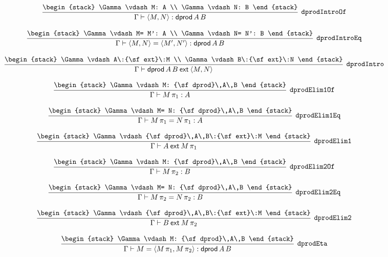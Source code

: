 \[
\infer[{\tt dprodIntroOf}]{\Gamma \vdash \langle M,N\rangle : {\sf dprod}\,A\,B}{
\begin{stack}
\Gamma \vdash M: A
\\
\Gamma \vdash N: B
\end{stack}}
\]

\[
\infer[{\tt dprodIntroEq}]{\Gamma \vdash \langle M,N\rangle = \langle M',N'\rangle : {\sf dprod}\,A\,B}{
\begin{stack}
\Gamma \vdash M= M': A
\\
\Gamma \vdash N= N': B
\end{stack}}
\]

\[
\infer[{\tt dprodIntro}]{\Gamma \vdash {\sf dprod}\,A\,B\:{\sf ext}\:\langle M,N\rangle }{
\begin{stack}
\Gamma \vdash A\:{\sf ext}\:M
\\
\Gamma \vdash B\:{\sf ext}\:N
\end{stack}}
\]

\[
\infer[{\tt dprodElim1Of}]{\Gamma \vdash M\, \pi_1: A}{
\begin{stack}
\Gamma \vdash M: {\sf dprod}\,A\,B
\end{stack}}
\]

\[
\infer[{\tt dprodElim1Eq}]{\Gamma \vdash M\, \pi_1= N\, \pi_1: A}{
\begin{stack}
\Gamma \vdash M= N: {\sf dprod}\,A\,B
\end{stack}}
\]

\[
\infer[{\tt dprodElim1}]{\Gamma \vdash A\:{\sf ext}\:M\, \pi_1}{
\begin{stack}
\Gamma \vdash {\sf dprod}\,A\,B\:{\sf ext}\:M
\end{stack}}
\]

\[
\infer[{\tt dprodElim2Of}]{\Gamma \vdash M\, \pi_2: B}{
\begin{stack}
\Gamma \vdash M: {\sf dprod}\,A\,B
\end{stack}}
\]

\[
\infer[{\tt dprodElim2Eq}]{\Gamma \vdash M\, \pi_2= N\, \pi_2: B}{
\begin{stack}
\Gamma \vdash M= N: {\sf dprod}\,A\,B
\end{stack}}
\]

\[
\infer[{\tt dprodElim2}]{\Gamma \vdash B\:{\sf ext}\:M\, \pi_2}{
\begin{stack}
\Gamma \vdash {\sf dprod}\,A\,B\:{\sf ext}\:M
\end{stack}}
\]

\[
\infer[{\tt dprodEta}]{\Gamma \vdash M= \langle M\, \pi_1,M\, \pi_2\rangle : {\sf dprod}\,A\,B}{
\begin{stack}
\Gamma \vdash M: {\sf dprod}\,A\,B
\end{stack}}
\]

